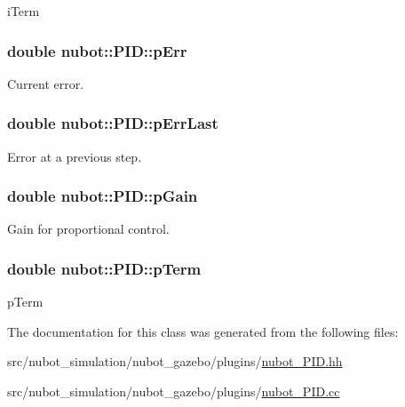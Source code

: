 i\-Term 

\hypertarget{classnubot_1_1PID_a3b4084ff47368c23428b95c2fa6d78ee}{
\subsubsection[{p\-Err}]{\setlength{\rightskip}{0pt plus 5cm}double nubot\-::\-P\-I\-D\-::p\-Err\hspace{0.3cm}{\ttfamily [private]}}}\label{classnubot_1_1PID_a3b4084ff47368c23428b95c2fa6d78ee}


Current error. 

\hypertarget{classnubot_1_1PID_ab22052153953c1a8b5eee63ab415fa2a}{
\subsubsection[{p\-Err\-Last}]{\setlength{\rightskip}{0pt plus 5cm}double nubot\-::\-P\-I\-D\-::p\-Err\-Last\hspace{0.3cm}{\ttfamily [private]}}}\label{classnubot_1_1PID_ab22052153953c1a8b5eee63ab415fa2a}


Error at a previous step. 

\hypertarget{classnubot_1_1PID_a515d0b570daa43350349e1b776860a58}{
\subsubsection[{p\-Gain}]{\setlength{\rightskip}{0pt plus 5cm}double nubot\-::\-P\-I\-D\-::p\-Gain\hspace{0.3cm}{\ttfamily [private]}}}\label{classnubot_1_1PID_a515d0b570daa43350349e1b776860a58}


Gain for proportional control. 

\hypertarget{classnubot_1_1PID_ac209a483d85ab0a198d36709dd0d089d}{
\subsubsection[{p\-Term}]{\setlength{\rightskip}{0pt plus 5cm}double nubot\-::\-P\-I\-D\-::p\-Term\hspace{0.3cm}{\ttfamily [private]}}}\label{classnubot_1_1PID_ac209a483d85ab0a198d36709dd0d089d}


p\-Term 



The documentation for this class was generated from the following files\-:\begin{DoxyCompactItemize}
\item 
src/nubot\-\_\-simulation/nubot\-\_\-gazebo/plugins/\hyperlink{nubot__PID_8hh}{nubot\-\_\-\-P\-I\-D.\-hh}\item 
src/nubot\-\_\-simulation/nubot\-\_\-gazebo/plugins/\hyperlink{nubot__PID_8cc}{nubot\-\_\-\-P\-I\-D.\-cc}\end{DoxyCompactItemize}

